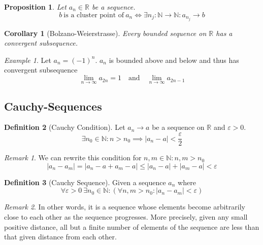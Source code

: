\documentclass[english,titlepage]{uzhpub}
\theoremstyle{definition}
\newtheorem{definition}{Definition}[section]
\theoremstyle{plain}
\newtheorem{proposition}[definition]{Proposition}
\newtheorem{corollary}{Corollary}[theorem]
\theoremstyle{remark}
\newtheorem*{remark}{Remark}
\theoremstyle{example}
\newtheorem*{example}{Example}
\begin{document}
   \begin{proposition}\label{pro:subseq_converges_cluster_point}
      Let \(a_n \in \mathbb{R}\) be a sequence.
      \[b~\text{is a cluster point of}~a_n \iff \exists n_j: \mathbb{N} \to \mathbb{N}: a_{n_j} \to b\]
   \end{proposition}

   \begin{corollary}[Bolzano-Weierstrasse]\label{cor:bolzano_weierstrasse}
      Every bounded sequence on \(\mathbb{R}\) has a convergent subsequence.
   \end{corollary}
   \begin{example}
      Let \(a_n = (-1)^n\).
      \(a_n\) is bounded above and below and thus has convergent subsequence
      \[\lim_{n \to \infty} a_{2n} = 1 \quad\text{and}\quad \lim_{n \to \infty} a_{2n-1}\]
   \end{example}

   \subsection{Cauchy-Sequences}
   \begin{definition}[Cauchy Condition]\label{def:cauchy_condition}
      Let \(a_n \to a\) be a sequence on \(\mathbb{R}\) and \(\varepsilon > 0\).
      \[\exists n_0 \in \mathbb{N}: n > n_0 \implies |a_n -a| < \frac{\varepsilon}{2}\]
   \end{definition}
   \begin{remark}
      We can rewrite this condition for \(n, m \in \mathbb{N}: n, m > n_0\)
      \[|a_n - a_m| = |a_n - a + a_m - a| \leq |a_n - a| + |a_m - a| < \varepsilon\]
   \end{remark}

   \begin{definition}[Cauchy Sequence]
      Given a sequence \(a_n\) where
      \[\forall \varepsilon > 0~\exists n_0 \in \mathbb{N}: (\forall n, m > n_0: |a_n - a_m| < \varepsilon)\]
   \end{definition}
   \begin{remark}
      In other words, it is a sequence whose elements become arbitrarily close to each other as the sequence progresses.
      More precisely, given any small positive distance, all but a finite number of elements of the sequence are less than that given distance from each other.
   \end{remark}

   \begin{center}
      
   \end{center}
\end{document}
